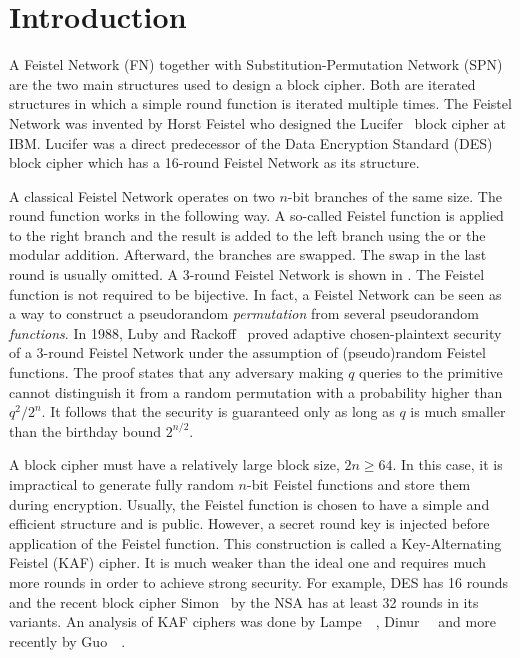 \section{Introduction}

A Feistel Network (FN) together with Substitution-Permutation Network (SPN) are the two main structures used to design a block cipher. Both are iterated structures in which a simple round function is iterated multiple times. The Feistel Network was invented by Horst Feistel who designed the Lucifer~\cite{Lucifer} block cipher at IBM. Lucifer was a direct predecessor of the Data Encryption Standard (DES)~\cite{DES} block cipher which has a 16-round Feistel Network as its structure.

A classical Feistel Network operates on two $n$-bit branches of the same size. The round function works in the following way. A so-called Feistel function is applied to the right branch and the result is added to the left branch using the \txor{} or the modular addition. Afterward, the branches are swapped. The swap in the last round is usually omitted. A 3-round Feistel Network is shown in . The Feistel function is not required to be bijective. In fact, a Feistel Network can be seen as a way to construct a pseudorandom \emph{permutation} from several pseudorandom \emph{functions}. In 1988, Luby and Rackoff~\cite{LubyRackoff} proved adaptive chosen-plaintext security of a 3-round Feistel Network under the assumption of (pseudo)random Feistel functions. The proof states that any adversary making $q$ queries to the primitive cannot distinguish it from a random permutation with a probability higher than $q^2/2^n$. It follows that the security is guaranteed only as long as $q$ is much smaller than the birthday bound $2^{n/2}$.


A block cipher must have a relatively large block size, $2n \ge 64$. In this case, it is impractical to generate fully random $n$-bit Feistel functions and store them during encryption. Usually, the Feistel function is chosen to have a simple and efficient structure and is public. However, a secret round key is injected before application of the Feistel function. This construction is called a Key-Alternating Feistel (KAF) cipher. It is much weaker than the ideal one and requires much more rounds in order to achieve strong security. For example, DES has 16 rounds and the recent block cipher Simon~\cite{Simon} by the NSA has at least 32 rounds in its variants. An analysis of KAF ciphers was done by  Lampe~\etal{}~\cite{KeyFeistel1}, Dinur~\etal{}~\cite{KeyFeistel2} and more recently by Guo~\etal{}~\cite{KeyFeistel3}.

